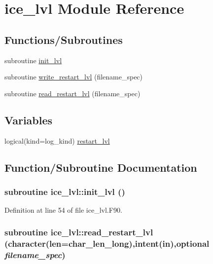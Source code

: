 \hypertarget{namespaceice__lvl}{
\section{ice\_\-lvl Module Reference}
\label{namespaceice__lvl}
}
\subsection*{Functions/Subroutines}
\begin{DoxyCompactItemize}
\item 
subroutine \hyperlink{namespaceice__lvl_a4298ecb49107c3f040307793376f2215}{init\_\-lvl}
\item 
subroutine \hyperlink{namespaceice__lvl_adee9ebc38f9bb2b4317bd8d3660f2976}{write\_\-restart\_\-lvl} (filename\_\-spec)
\item 
subroutine \hyperlink{namespaceice__lvl_a232fc1c39cbe24fe6ab3f1e65457b4fa}{read\_\-restart\_\-lvl} (filename\_\-spec)
\end{DoxyCompactItemize}
\subsection*{Variables}
\begin{DoxyCompactItemize}
\item 
logical(kind=log\_\-kind) \hyperlink{namespaceice__lvl_a889f31c602d28473918e09b006ae7e0f}{restart\_\-lvl}
\end{DoxyCompactItemize}


\subsection{Function/Subroutine Documentation}
\hypertarget{namespaceice__lvl_a4298ecb49107c3f040307793376f2215}{
\subsubsection[{init\_\-lvl}]{\setlength{\rightskip}{0pt plus 5cm}subroutine ice\_\-lvl::init\_\-lvl ()}}
\label{namespaceice__lvl_a4298ecb49107c3f040307793376f2215}


Definition at line 54 of file ice\_\-lvl.F90.\hypertarget{namespaceice__lvl_a232fc1c39cbe24fe6ab3f1e65457b4fa}{
\subsubsection[{read\_\-restart\_\-lvl}]{\setlength{\rightskip}{0pt plus 5cm}subroutine ice\_\-lvl::read\_\-restart\_\-lvl (character(len=char\_\-len\_\-long),intent(in),optional {\em filename\_\-spec})}}
\label{namespaceice__lvl_a232fc1c39cbe24fe6ab3f1e65457b4fa}


